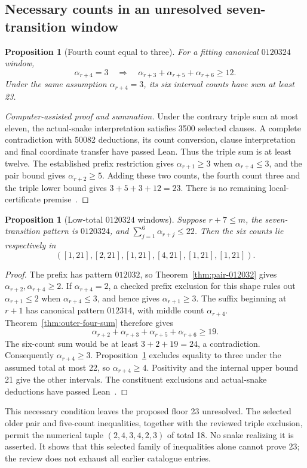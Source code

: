 \documentclass[11pt,a4paper]{article}
\newtheorem{proposition}[theorem]{Proposition}
\theoremstyle{definition}
\theoremstyle{remark}
\begin{document}
\subsection{Necessary counts in an unresolved seven-transition window}\label{sec:critical-six}
\begin{proposition}[Fourth count equal to three]\label{prop:fourth-three-twelve}
For a fitting canonical $0120324$ window,
\[
\alpha_{r+4}=3\quad\Longrightarrow\quad
\alpha_{r+3}+\alpha_{r+5}+\alpha_{r+6}\ge12.
\]
Under the same assumption $\alpha_{r+4}=3$, its six internal counts have sum at least 23.
\end{proposition}
\begin{proof}[Computer-assisted proof and summation]
Under the contrary triple sum at most eleven, the actual-snake interpretation
satisfies 3500 selected clauses. A complete contradiction with 50082 deductions,
its count conversion, clause interpretation and final coordinate transfer have
passed Lean. Thus the triple sum is at least twelve. The established prefix
restriction gives $\alpha_{r+1}\ge3$ when $\alpha_{r+4}\le3$, and the
pair bound gives $\alpha_{r+2}\ge5$. Adding these two counts, the fourth
count three and the triple lower bound gives $3+5+3+12=23$.
There is no remaining local-certificate premise~\cite{endpointcompletionarchive}.
\end{proof}


\begin{proposition}[Low-total $0120324$ windows]\label{prop:critical-six-intervals}
Suppose $r+7\le m$, the seven-transition pattern is $0120324$, and
$\sum_{j=1}^{6}\alpha_{r+j}\le22$. Then the six counts lie respectively in
\[
([1,21],[2,21],[1,21],[4,21],[1,21],[1,21]).
\]
\end{proposition}
\begin{proof}
The prefix has pattern $012032$, so Theorem~\ref{thm:pair-012032} gives
$\alpha_{r+2},\alpha_{r+4}\ge2$. If $\alpha_{r+4}=2$, a checked prefix
exclusion for this shape rules out $\alpha_{r+1}\le2$ when
$\alpha_{r+4}\le3$, and hence gives $\alpha_{r+1}\ge3$. The suffix beginning
at $r+1$ has canonical pattern $012314$, with middle count $\alpha_{r+4}$.
Theorem~\ref{thm:outer-four-sum} therefore gives
\[
\alpha_{r+2}+\alpha_{r+3}+\alpha_{r+5}+\alpha_{r+6}\ge19.
\]
The six-count sum would be at least $3+2+19=24$, a contradiction.
Consequently $\alpha_{r+4}\ge3$. Proposition~\ref{prop:fourth-three-twelve}
excludes equality to three under the assumed total at most 22, so
$\alpha_{r+4}\ge4$. Positivity and the internal upper bound 21 give the
other intervals. The constituent exclusions and actual-snake deductions
have passed Lean~\cite{criticalsixarchive,endpointcompletionarchive}.
\end{proof}
This necessary condition leaves the proposed floor 23 unresolved. The
selected older pair and five-count inequalities, together with the reviewed
triple exclusion, permit the numerical tuple $(2,4,3,4,2,3)$ of total 18.
No snake realizing it is asserted. It shows that this selected family of
inequalities alone cannot prove 23; the review does not exhaust all earlier
catalogue entries.
\end{document}
